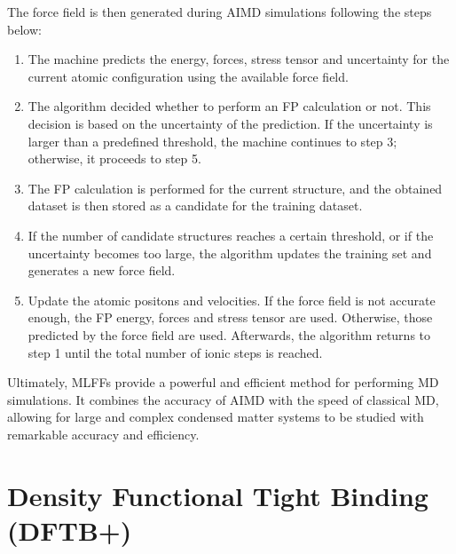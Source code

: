 The force field is then generated during AIMD simulations following the steps below:
\begin{enumerate}
    \item The machine predicts the energy, forces, stress tensor and uncertainty for the current atomic configuration using the available force field. 

    \item The algorithm decided whether to perform an FP calculation or not. This decision is based on the uncertainty of the prediction. If the uncertainty is larger than a predefined threshold, the machine continues to step 3; otherwise, it proceeds to step 5. 

    \item The FP calculation is performed for the current structure, and the obtained dataset is then stored as a candidate for the training dataset. 

    \item If the number of candidate structures reaches a certain threshold, or if the uncertainty becomes too large, the algorithm updates the training set and generates a new force field. 

    \item Update the atomic positons and velocities. If the force field is not accurate enough, the FP energy, forces and stress tensor are used. Otherwise, those predicted by the force field are used. Afterwards, the algorithm returns to step 1 until the total number of ionic steps is reached.
\end{enumerate}

Ultimately, MLFFs provide a powerful and efficient method for performing MD simulations. It combines the accuracy of AIMD with the speed of classical MD, allowing for large and complex condensed matter systems to be studied with remarkable accuracy and efficiency.

\section{Density Functional Tight Binding (DFTB+)}

